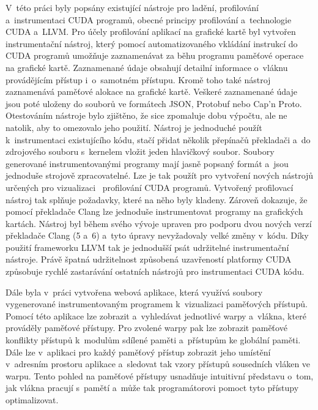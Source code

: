V~této práci byly popsány existující nástroje pro ladění, profilování a~instrumentaci CUDA programů, obecné principy profilování a~technologie CUDA a~LLVM. Pro účely profilování aplikací na grafické kartě byl vytvořen instrumentační nástroj, který pomocí automatizovaného vkládání instrukcí do CUDA programů umožňuje zaznamenávat za běhu programu paměťové operace na grafické kartě. Zaznamenané údaje obsahují detailní informace o~vláknu provádějícím přístup i~o~samotném přístupu. Kromě toho také nástroj zaznamenává paměťové alokace na grafické kartě. Veškeré zaznamenané údaje jsou poté uloženy do souborů ve formátech JSON, Protobuf nebo Cap'n Proto. Otestováním nástroje bylo zjištěno, že sice zpomaluje dobu výpočtu, ale ne natolik, aby to omezovalo jeho použití. Nástroj je jednoduché použít k~instrumentaci existujícího kódu, stačí přidat několik přepínačů překladači a~do zdrojového souboru s~kernelem vložit jeden hlavičkový soubor. Soubory generované instrumentovanými programy mají jasně popsaný formát a~jsou jednoduše strojově zpracovatelné. Lze je tak použít pro vytvoření nových nástrojů určených pro vizualizaci ~profilování CUDA programů. Vytvořený profilovací nástroj tak splňuje požadavky, které na něho byly kladeny. Zároveň dokazuje, že pomocí překladače Clang lze jednoduše instrumentovat programy na grafických kartách. Nástroj byl během svého vývoje upraven pro podporu dvou nových verzí překladače Clang (5 a~6) a~tyto úpravy nevyžadovaly velké změny v~kódu. Díky použití frameworku LLVM tak je jednodušší psát udržitelné instrumentační nástroje. Právě špatná udržitelnost způsobená uzavřeností platformy CUDA způsobuje rychlé zastarávání ostatních nástrojů pro instrumentaci CUDA kódu.

Dále byla v~práci vytvořena webová aplikace, která využívá soubory vygenerované instrumentovaným programem k~vizualizaci paměťových přístupů. Pomocí této aplikace lze zobrazit a~vyhledávat jednotlivé warpy a~vlákna, které prováděly paměťové přístupy. Pro zvolené warpy pak lze zobrazit paměťové konflikty přístupů k~modulům sdílené paměti a~přístupům ke globální paměti. Dále lze v~aplikaci pro každý paměťový přístup zobrazit jeho umístění v~adresním prostoru aplikace a~sledovat tak vzory přístupů sousedních vláken ve warpu. Tento pohled na paměťové přístupy usnadňuje intuitivní představu o~tom, jak vlákna pracují s~pamětí a~může tak programátorovi pomoct tyto přístupy optimalizovat.

